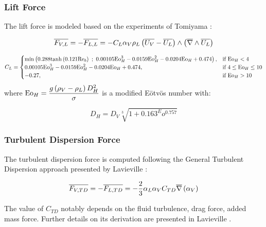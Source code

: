 \subsubsection{Lift Force}

The lift force is modeled based on the experiments of Tomiyama \etal \cite{tomiyama_transverse_2002}:

\begin{equation}
\overline{F_{V,L}}=-\overline{F_{L,L}}=-C_{L}\alpha_{V}\rho_{L}\left( \overline{U_{V}}-\overline{U_{L}}  \right)\wedge \left( \overline{\nabla}\wedge{\overline{U_{L}}}  \right)
\label{eq:ncfd_lift}
\end{equation}

\begin{equation}
C_{L} = \begin{cases}
    \min{0.288\tanh{0.121\Re_{b}}\ ;\ 0.00105 \Eo_{H}^{3}-0.0159\Eo_{H}^{2} - 0.0204\Eo_{H}+0.474}, & \text{if}\ \Eo_{H}<4\\
   0.00105 \Eo_{H}^{3}-0.0159\Eo_{H}^{2} - 0.0204\Eo_{H}+0.474, & \text{if}\ 4\leq \Eo_{H} \leq 10\\
   -0.27, & \text{if}\ \Eo_{H}>10
  \end{cases}
\end{equation}
where $\mathrm{Eo}_{H} = \dfrac{g\left( \rho_{V}-\rho_{L} \right)D_{H}^{2}}{\sigma}$ is a modified E\"otv\"os number with:

\begin{equation}
D_{H} = D_{V}\sqrt[3]{1+0.163^Eo^{0.757}}
\end{equation}

\subsubsection{Turbulent Dispersion Force}

The turbulent dispersion force is computed following the General Turbulent Dispersion approach presented by Lavieville \etal \cite{lavieville_generalized_2017}:

\begin{equation}
\overline{F_{V,TD}}=-\overline{F_{L,TD}}=-\frac{2}{3}\alpha_{L}\alpha_{V}C_{TD}\overline{\nabla}\left({\alpha_{V}}\right)
\label{eq:ncfd_turb_disp}
\end{equation}

The value of $C_{TD}$ notably depends on the fluid turbulence, drag force, added mass force. Further details on its derivation are presented in Lavieville \etal \cite{lavieville_generalized_2017}.


